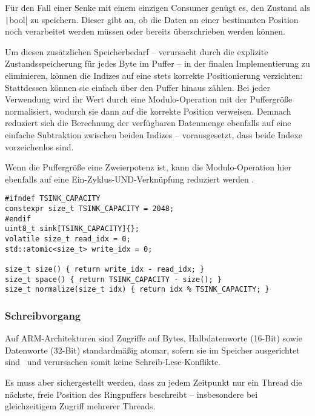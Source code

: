 Für den Fall einer Senke mit einem einzigen Consumer genügt es, den Zustand als
\texttt|bool| zu speichern. Dieser gibt an, ob die Daten an einer
bestimmten Position noch verarbeitet werden müssen oder bereits überschrieben
werden können.

Um diesen zusätzlichen Speicherbedarf -- verursacht durch die explizite
Zustandsspeicherung für jedes Byte im Puffer -- in der finalen Implementierung
zu eliminieren, können die Indizes auf eine stets korrekte Positionierung
verzichten: Stattdessen können sie einfach über den Puffer hinaus zählen. Bei
jeder Verwendung wird ihr Wert durch eine Modulo-Operation mit der Puffergröße
normalisiert, wodurch sie dann auf die korrekte Position verweisen. Demnach
reduziert sich die Berechnung der verfügbaren Datenmenge ebenfalls auf eine
einfache Subtraktion zwischen beiden Indizes -- vorausgesetzt, dass beide Indexe
vorzeichenlos sind.

Wenn die Puffergröße eine Zweierpotenz ist, kann die Modulo-Operation hier
ebenfalls auf eine Ein-Zyklus-UND-Verknüpfung reduziert werden
\cite{stackoverflow_mod, arm_instruction_set}.

\begin{code}
\begin{verbatim}
#ifndef TSINK_CAPACITY
constexpr size_t TSINK_CAPACITY = 2048;
#endif
uint8_t sink[TSINK_CAPACITY]{};
volatile size_t read_idx = 0;
std::atomic<size_t> write_idx = 0;

size_t size() { return write_idx - read_idx; }
size_t space() { return TSINK_CAPACITY - size(); }
size_t normalize(size_t idx) { return idx % TSINK_CAPACITY; }
\end{verbatim}
\end{code}

\subsubsection{Schreibvorgang}

Auf ARM-Architekturen sind Zugriffe auf Bytes, Halbdatenworte (16-Bit) sowie
Datenworte (32-Bit) standardmäßig atomar, sofern sie im Speicher ausgerichtet
sind~\cite[S. A3-79]{ARM_DDI0403_EE} und verursachen somit keine
Schreib-Lese-Konflikte.

Es muss aber sichergestellt werden, dass zu jedem Zeitpunkt nur ein Thread die
nächste, freie Position des Ringpuffers beschreibt -- insbesondere bei
gleichzeitigem Zugriff mehrerer Threads.

